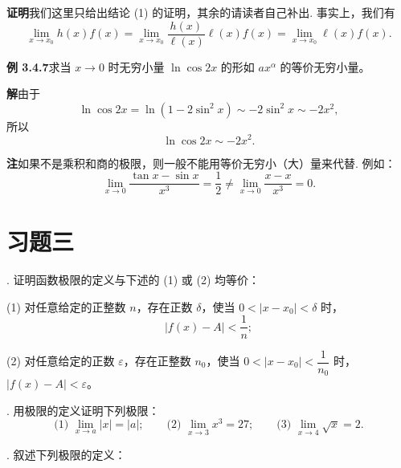\documentclass[UTF8,12pt,a4paper,fontset=fandol]{ctexart}
\begin{document}
\noindent\textbf{证明}\quad 我们这里只给出结论 (1) 的证明，其余的请读者自己补出. 事实上，我们有
\[
  \lim_{x\to x_0}h(x)f(x)
  =
  \lim_{x\to x_0}\frac{h(x)}{\ell(x)}\ell(x)f(x)
  =
  \lim_{x\to x_0}\ell(x)f(x).
\]

\noindent\textbf{例 3.4.7}\quad 求当 $x\to0$ 时无穷小量 $\ln\cos 2x$ 的形如 $ax^\alpha$ 的等价无穷小量。

\noindent\textbf{解}\quad 由于
\[
  \ln\cos 2x
  =
  \ln(1-2\sin^2x)
  \sim
  -2\sin^2x
  \sim
  -2x^2,
\]
所以
\[
  \ln\cos 2x\sim -2x^2.
\]

\noindent\textbf{注}\quad 如果不是乘积和商的极限，则一般不能用等价无穷小（大）量来代替. 例如：
\[
  \lim_{x\to0}\frac{\tan x-\sin x}{x^3}
  =
  \frac12
  \ne
  \lim_{x\to0}\frac{x-x}{x^3}
  =
  0.
\]

\section*{习题三}

. 证明函数极限的定义与下述的 (1) 或 (2) 均等价：

(1) 对任意给定的正整数 $n$，存在正数 $\delta$，使当 $0<|x-x_0|<\delta$ 时，
\[
  |f(x)-A|<\frac1n;
\]

(2) 对任意给定的正数 $\varepsilon$，存在正整数 $n_0$，使当 $0<|x-x_0|<\dfrac1{n_0}$ 时，$|f(x)-A|<\varepsilon$。

. 用极限的定义证明下列极限：
\[
  \text{(1) }\lim_{x\to a}|x|=|a|;\qquad
  \text{(2) }\lim_{x\to3}x^3=27;\qquad
  \text{(3) }\lim_{x\to4}\sqrt{x}=2.
\]

. 叙述下列极限的定义：
\end{document}
